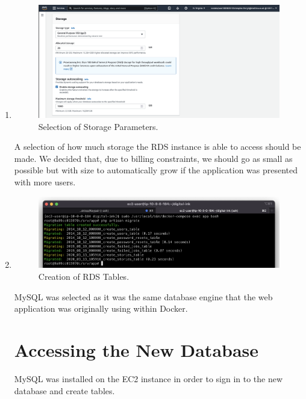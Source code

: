 \begin{enumerate}
    \item
    \begin{figure}[H]
        \centering
        \includegraphics[width=\textwidth]{resources/rds/rds-storage}
        \caption{Selection of Storage Parameters.}
        \label{fig:rds-storage}
    \end{figure}
    A selection of how much storage the RDS instance is able to access should be made.
    We decided that, due to billing constraints, we should go as small as possible but with size to automatically grow if
    the application was presented with more users.

    \item
    \begin{figure}[H]
        \centering
        \includegraphics[width=\textwidth]{resources/rds/rds-tables-creation}
        \caption{Creation of RDS Tables.}
        \label{fig:rds-tables}
    \end{figure}
    MySQL was selected as it was the same database engine that the web application was originally using within Docker.

    \section{Accessing the New Database}\label{sec:accessing-the-new-database}
    MySQL was installed on the EC2 instance in order to sign in to the new database and create tables.


\end{enumerate}
